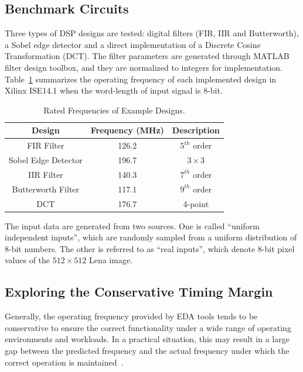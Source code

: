 \documentclass[journal]{IEEEtran}
\begin{document}
\subsection{Benchmark Circuits}
Three types of DSP designs are tested: digital filters (FIR, IIR and Butterworth), a Sobel edge detector and a direct implementation of a Discrete Cosine Transformation (DCT). The filter parameters are generated through MATLAB filter design toolbox, and they are normalized to integers for implementation. Table~\ref{Rated_Frequency_table} summarizes the operating frequency of each implemented design in Xilinx ISE14.1 when the word-length of input signal is 8-bit.
\vspace{-0.5ex}
\begin{table}[htbp]
\renewcommand{\arraystretch}{1.2}
\caption{Rated Frequencies of Example Designs.}
\label{Rated_Frequency_table}
\begin{center}
\footnotesize
\begin{tabular}{ccc}
\hline
\hline
Design & Frequency (MHz) & Description\\
\hline
FIR Filter & 126.2 & $5^{th}$ order\\
Sobel Edge Detector & 196.7 & $3\times 3$\\
IIR Filter & 140.3 & $7^{th}$ order\\
Butterworth Filter & 117.1 & $9^{th}$ order\\
DCT & 176.7 & 4-point\\
\hline
\hline
\end{tabular}
\normalsize
\end{center}
\end{table}

The input data are generated from two sources. One is called ``uniform independent inputs'', which are randomly sampled from a uniform distribution of 8-bit numbers. The other is referred to as ``real inputs'', which denote 8-bit pixel values of the $512\! \times\! 512$ Lena image.

\subsection{Exploring the Conservative Timing Margin} %
\label{sub:exploring_the_conservative_timing_margin}

Generally, the operating frequency provided by EDA tools tends to be conservative to ensure the correct functionality under a wide range of operating environments and workloads. In a practical situation, this may result in a large gap between the predicted frequency and the actual frequency under which the correct operation is maintained~\cite{gojman2013FPGA}.
\end{document}
